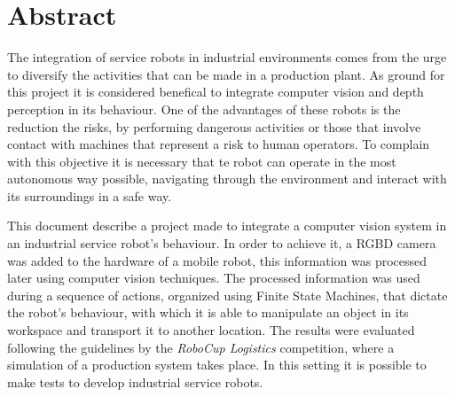 \chapter*{Abstract}
The integration of service robots in industrial environments comes from the urge to diversify the activities that can be made in a production plant. As ground for this project it is considered benefical to integrate computer vision and depth perception in its behaviour. One of the advantages of these robots is the reduction the risks, by performing dangerous activities or those that involve contact with machines that represent a risk to human operators. To complain with this objective it is necessary that te robot can operate in the most autonomous way possible, navigating through the environment and interact with its surroundings in a safe way.

This document describe a project made to integrate a computer vision system in an industrial service robot's behaviour. In order to achieve it, a RGBD camera was added to the hardware of a mobile robot, this information was processed later using computer vision techniques. The processed information was used during a sequence of actions, organized using Finite State Machines, that dictate the robot's behaviour, with which it is able to manipulate an object in its workspace and transport it to another location.
The results were evaluated following the guidelines by the \textit{RoboCup Logistics} competition, where a simulation of a production system takes place. In this setting it is possible to make tests to develop industrial service robots.